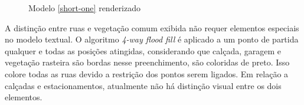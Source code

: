 \begin{figure}[ht!]
  \centering
  \caption{Modelo \ref{short-one} renderizado}
\end{figure}

A distinção entre ruas e vegetação comum exibida não requer elementos
especiais no modelo textual. O algoritmo \textit{4-way flood fill} é
aplicado a um ponto de partida qualquer e todas as posições atingidas,
considerando que calçada, garagem e vegetação rasteira são bordas
nesse preenchimento, são coloridas de preto. Isso colore todas as ruas
devido a restrição dos pontos serem ligados. Em relação a calçadas e
estacionamentos, atualmente não há distinção visual entre os dois
elementos.

